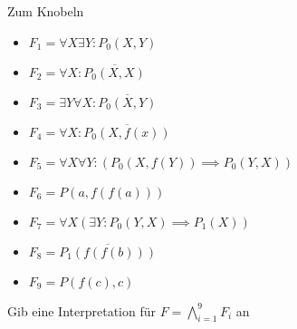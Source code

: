 {\begin{frame}{Zum Knobeln}
    \small
    \begin{block}{}
        \begin{multicols}{2}
            \begin{itemize}
                \item $F_1 = \forall X \exists Y: P_0(X,Y)$
                \item $F_2 = \forall X: \overline{P_0(X,X)}$
                \item $F_3 = \exists Y \forall X: \overline{P_0(X,Y)}$
                \item $F_4 = \forall X: \overline{P_0(X,f(x))}$
                \item {\scriptsize$F_5 = \forall X \forall Y: (P_0(X,f(Y)) \implies P_0(Y,X))$}
                \item $F_6 = P(a, f(f(a)))$
                \item $F_7 = \forall X (\exists Y: P_0(Y,X)\implies P_1(X))$
                \item $F_8 = \overline{P_1(f(f(b)))}$
                \item $F_9 = P(f(c),c)$
            \end{itemize}
        \end{multicols}
        Gib eine Interpretation für $F = \bigwedge_{i=1}^9 F_i$ an
    \end{block}
\end{frame}
}